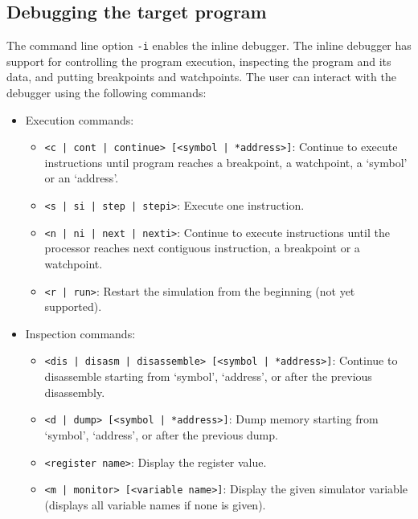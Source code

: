 \subsection{Debugging the target program}
\label{tms320c3x_inline_debug}

The command line option \texttt{-i} enables the inline debugger. The inline debugger has support for controlling the program execution, inspecting the program and its data, and putting breakpoints and watchpoints. The user can interact with the debugger using the following commands:
\begin{itemize}
\item Execution commands:
	\begin{itemize}
	\item \texttt{<c | cont | continue> [<symbol | *address>]}: \newline
	Continue to execute instructions until program reaches a breakpoint, a watchpoint, a `symbol' or an `address'.
	\item \texttt{<s | si | step | stepi>}: \newline
	Execute one instruction.
	\item \texttt{<n | ni | next | nexti>}: \newline
	Continue to execute instructions until the processor reaches next contiguous instruction, a breakpoint or a watchpoint.
	\item \texttt{<r | run>}: \newline
	Restart the simulation from the beginning (not yet supported).
	\end{itemize}
\item Inspection commands:
	\begin{itemize}
	\item \texttt{<dis | disasm | disassemble> [<symbol | *address>]}: \newline
	Continue to disassemble starting from `symbol', `address', or after the previous disassembly.
	\item \texttt{<d | dump> [<symbol | *address>]}: \newline
	Dump memory starting from `symbol', `address', or after the previous dump.
	\item \texttt{<register name>}: \newline
	Display the register value.
	\item \texttt{<m | monitor> [<variable name>]}: \newline
	Display the given simulator variable (displays all variable names if none is given).

\end{itemize}
\end{itemize}
